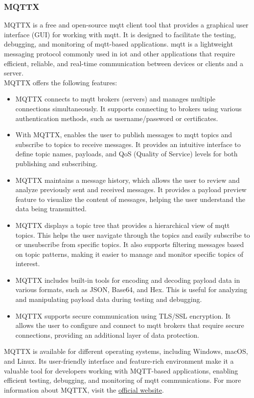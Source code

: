 \subsubsection{MQTTX}
MQTTX is a free and open-source \gls{mqtt} client tool that provides a graphical user interface (GUI) for working with \gls{mqtt}. It is designed to facilitate the testing, debugging, and monitoring of \gls{mqtt}-based applications. \gls{mqtt} is a lightweight messaging protocol commonly used in \gls{iot} and other applications that require efficient, reliable, and real-time communication between devices or clients and a server.\vspace{5mm} \\
MQTTX offers the following features:
\begin{itemize}
  \item MQTTX connects to \gls{mqtt} brokers (servers) and manages multiple connections simultaneously. It supports connecting to brokers using various authentication methods, such as username/password or certificates.
  \item With MQTTX, enables the user to publish messages to \gls{mqtt} topics and subscribe to topics to receive messages. It provides an intuitive interface to define topic names, payloads, and QoS (Quality of Service) levels for both publishing and subscribing.
  \item MQTTX maintains a message history, which allows the user to review and analyze previously sent and received messages. It provides a payload preview feature to visualize the content of messages, helping the user understand the data being transmitted.
  \item MQTTX displays a topic tree that provides a hierarchical view of \gls{mqtt} topics. This helps the user navigate through the topics and easily subscribe to or unsubscribe from specific topics. It also supports filtering messages based on topic patterns, making it easier to manage and monitor specific topics of interest.
  \item MQTTX includes built-in tools for encoding and decoding payload data in various formats, such as JSON, Base64, and Hex. This is useful for analyzing and manipulating payload data during testing and debugging.
  \item  MQTTX supports secure communication using TLS/SSL encryption. It allows the user to configure and connect to \gls{mqtt} brokers that require secure connections, providing an additional layer of data protection.
\end{itemize}
MQTTX is available for different operating systems, including Windows, macOS, and Linux. Its user-friendly interface and feature-rich environment make it a valuable tool for developers working with MQTT-based applications, enabling efficient testing, debugging, and monitoring of \gls{mqtt} communications.
For more information about MQTTX, visit the \href{https://mqttx.app/}{official website}.
